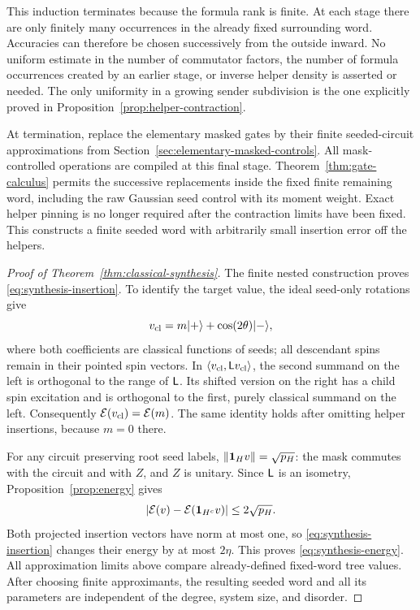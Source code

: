 This induction terminates because the formula rank is finite.
At each stage there are only finitely many occurrences in the
already fixed surrounding word.  Accuracies can therefore be chosen
successively from the outside inward.  No uniform estimate in the
number of commutator factors, the number of formula occurrences
created by an earlier stage, or inverse helper density is asserted
or needed.  The only uniformity in a growing sender subdivision is
the one explicitly proved in
Proposition~\ref{prop:helper-contraction}.

At termination, replace the elementary masked gates by their finite
seeded-circuit approximations from
Section~\ref{sec:elementary-masked-controls}.  All
mask-controlled operations are compiled at this final stage.
Theorem~\ref{thm:gate-calculus} permits the successive replacements
inside the fixed finite remaining word, including the raw Gaussian
seed control with its moment weight.  Exact helper pinning is no
longer required after the contraction limits have been fixed.
This constructs a finite seeded word with arbitrarily small
insertion error off the helpers.

\begin{proof}[Proof of Theorem~\ref{thm:classical-synthesis}]
The finite nested construction proves
\eqref{eq:synthesis-insertion}.  To identify the target value,
the ideal seed-only rotations give
\[
 v_{\mathrm{cl}}
  =m\lvert +\rangle+\cos(2\theta)\lvert -\rangle,
\]
where both coefficients are classical functions of seeds; all
descendant spins remain in their pointed spin vectors.  In
\(\langle v_{\mathrm{cl}},\mathsf L v_{\mathrm{cl}}\rangle\), the second
summand on the left is orthogonal to the range of \(\mathsf L\).  Its
shifted version on the right has a child spin excitation and is
orthogonal to the first, purely classical summand on the left.
Consequently \(\mathcal E(v_{\mathrm{cl}})=\mathcal E(m)\).  The same identity
holds after omitting helper insertions, because \(m=0\) there.

For any circuit preserving root seed labels,
\(\lVert \mathbf 1_Hv\rVert=\sqrt{p_H}\): the mask commutes with the circuit
and with \(Z\), and \(Z\) is unitary.  Since \(\mathsf L\) is an
isometry, Proposition~\ref{prop:energy} gives
\[
 \lvert \mathcal E(v)-\mathcal E(\mathbf 1_{H^c}v)\rvert\le2\sqrt{p_H}.
\]
Both projected insertion vectors have norm at most one, so
\eqref{eq:synthesis-insertion} changes their energy by at most
\(2\eta\).  This proves \eqref{eq:synthesis-energy}.  All
approximation limits above compare already-defined fixed-word tree
values.  After choosing finite approximants, the resulting seeded
word and all its parameters are independent of the degree, system
size, and disorder.
\end{proof}
